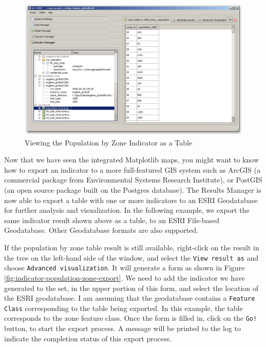 \begin{figure}[htp]
\begin{center}
\includegraphics[scale=0.4]{graphics/indicator-population-zone-table.png}
\end{center}
\caption{Viewing the Population by Zone Indicator as a Table}
\label{fig:indicator-population-zone-table}
\end{figure}

Now that we have seen the integrated Matplotlib maps, you might want to know how to export an indicator to a more full-featured GIS system such as ArcGIS (a commercial package from Environmental Systems Research Institute), or PostGIS (an open source package built on the Postgres database).  The Results Manager is now able to export a table with one or more indicators to an ESRI Geodatabase for further analysis and visualization.  In the following example, we export the same indicator result shown above as a table, to an ESRI File-based Geodatabase.  Other Geodatabase formats are also supported.

If the population by zone table result is still available, right-click on the result in the tree on the left-hand side of the window, and select the \verb#View result as# and choose \verb#Advanced visualization#.  It will generate a form as shown in Figure \ref{fig:indicator-population-zone-export}.  We need to add the indicator we have generated to the set, in the upper portion of this form, and select the location of the ESRI geodatabase.  I am assuming that the geodatabase contains a \verb#Feature Class# corresponding to the table being exported. In this example, the table corresponds to the zone feature class.  Once the form is filled in, click on the \verb#Go!# button, to start the export process.  A message will be printed to the log to indicate the completion status of this export process.

